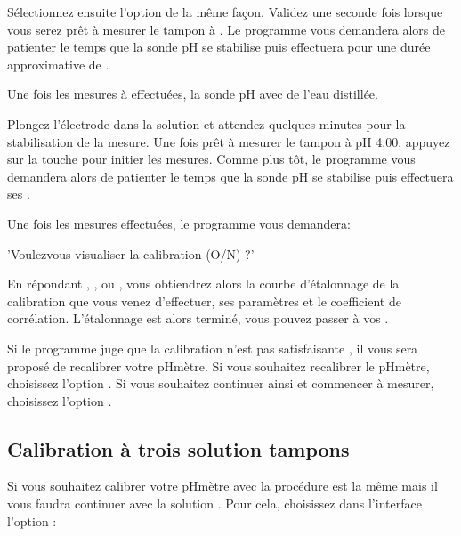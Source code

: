 \documentclass[letterpaper,10pt,french]{sphinxmanual}
\begin{document}
\sphinxAtStartPar
Sélectionnez ensuite l’option  de la même façon.
Validez une seconde fois lorsque vous serez prêt à mesurer le tampon à
. Le programme vous demandera alors de patienter  le temps que la sonde pH se
stabilise puis effectuera  pour une durée approximative de .

\sphinxAtStartPar
Une fois les mesures à  effectuées,  la sonde pH avec de l’eau distillée.

\sphinxAtStartPar
Plongez l’électrode dans la solution  et attendez quelques minutes pour la stabilisation de la
mesure. Une fois prêt à mesurer le tampon à pH 4,00, appuyez sur la touche  pour initier les
mesures. Comme plus tôt, le programme vous demandera alors de patienter  le temps que la sonde pH
se stabilise puis effectuera ses .

\sphinxAtStartPar
Une fois les mesures effectuées, le programme vous demandera:

\begin{sphinxVerbatim}[commandchars=\\\{\}]
’Voulez\PYGZhy{}vous visualiser la calibration (O/N) ?’
\end{sphinxVerbatim}

\sphinxAtStartPar
En répondant , ,  ou , vous obtiendrez alors la courbe d’étalonnage de la calibration
que vous venez d’effectuer, ses paramètres et le coefficient de corrélation. L’étalonnage est alors terminé, vous pouvez passer
à vos {\hyperref[\detokenize{mesure:mesure}]{}}.

\sphinxAtStartPar
Si le programme juge que la calibration n’est pas satisfaisante , il vous sera proposé de
recalibrer votre pH\sphinxhyphen{}mètre.
Si vous souhaitez recalibrer le pH\sphinxhyphen{}mètre, choisissez l’option .
Si vous souhaitez continuer ainsi et commencer à mesurer, choisissez l’option .


\subsection{Calibration à trois solution tampons}
\label{\detokenize{calib:calibration-a-trois-solution-tampons}}
\sphinxAtStartPar
Si vous souhaitez calibrer votre pH\sphinxhyphen{}mètre avec  la procédure est la même mais il vous faudra
continuer avec la solution .
Pour cela, choisissez dans l’interface  l’option :
\end{document}

